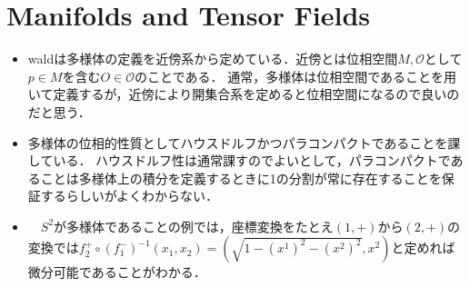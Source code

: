 \section{Manifolds and Tensor Fields}
\begin{itemize}
	\item waldは多様体の定義を近傍系から定めている．近傍とは位相空間$M, \mathcal{O}$として$p\in M$を含む$O\in \mathcal{O}$のことである．
	通常，多様体は位相空間であることを用いて定義するが，近傍により開集合系を定めると位相空間になるので良いのだと思う．
	\item 多様体の位相的性質としてハウスドルフかつパラコンパクトであることを課している．
	ハウスドルフ性は通常課すのでよいとして，パラコンパクトであることは多様体上の積分を定義するときに1の分割が常に存在することを保証するらしいがよくわからない．
	\item 　$S^2$が多様体であることの例では，座標変換をたとえ$(1, +)$から$(2, +)$の変換では$f_2^{+}\circ (f_1^-)^{-1}(x_1, x_2) = (\sqrt{1-(x^1)^2-(x^2)^2}, x^2)$と定めれば微分可能であることがわかる．
\end{itemize}
